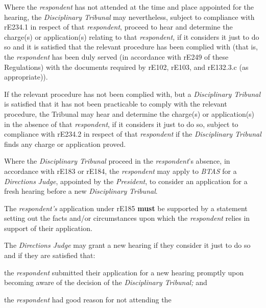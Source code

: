 Where the \emph{respondent} has not attended at the time and place
appointed for the hearing, the \emph{Disciplinary Tribunal} may
nevertheless, subject to compliance with rE234.1 in respect of
that \emph{respondent}, proceed to hear and determine the charge(s) or
application(s) relating to that \emph{respondent,} if it considers it
just to do so and it is satisfied that the relevant procedure has been
complied with (that is, the \emph{respondent} has been duly served (in
accordance with rE249 of these Regulations) with the documents required
by rE102, rE103, and rE132.3.c (as appropriate)).\\
\par
If the relevant procedure has not been complied with, but
a \emph{Disciplinary Tribunal} is satisfied that it has not been
practicable to comply with the relevant procedure, the Tribunal may hear
and determine the charge(s) or application(s) in the absence of
that \emph{respondent}, if it considers it just to do so, subject to
compliance with rE234.2 in respect of that \emph{respondent} if
the \emph{Disciplinary Tribunal} finds any charge or application
proved.\\
\par
{}
Where the \emph{Disciplinary Tribunal} proceed in
the \emph{respondent}'s absence, in accordance with rE183 or rE184,
the \emph{respondent} may apply to \emph{BTAS} for
a \emph{Directions} \emph{Judge}, appointed by the \emph{President}, to
consider an application for a fresh hearing before a
new \emph{Disciplinary} \emph{Tribunal}.\\
\par
The \emph{respondent's }application under rE185  \textcolor{myred}{\textbf{must}} be supported by a
statement setting out the facts and/or circumstances upon which
the \emph{respondent }relies in support of their application.\\
\par
The \emph{Directions Judge }may grant a new hearing if they consider it
just to do so and if they are satisfied that:\\\nl \item the \emph{respondent }submitted their application for a new hearing
promptly upon\textbf{ }becoming aware of the decision of
the \emph{Disciplinary Tribunal; }and\item the \emph{respondent }had good reason for not attending the
